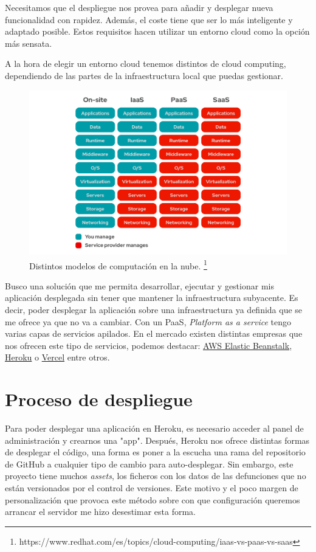 Necesitamos que el despliegue nos provea para añadir y desplegar nueva funcionalidad con rapidez. Además, el coste tiene que ser lo más inteligente y adaptado posible. Estos requisitos hacen utilizar un entorno cloud como la opción más sensata.

A la hora de elegir un entorno cloud tenemos distintos de cloud computing, dependiendo de las partes de la infraestructura local que puedas gestionar.

\FloatBarrier
\begin{figure}[h]
	\centering	
	\includegraphics[width=\textwidth]{doc/logos/imgs/iaas-paas.png}
	\caption{ Distintos modelos de computación en la nube. \footnote{https://www.redhat.com/es/topics/cloud-computing/iaas-vs-paas-vs-saas} }
    \label{fig:tipos-de-cc}
\end{figure}
\FloatBarrier

Busco una solución que me permita desarrollar, ejecutar y gestionar mis aplicación desplegada sin tener que mantener la infraestructura subyacente. Es decir, poder desplegar la aplicación sobre una infraestructura ya definida que se me ofrece ya que no va a cambiar. Con un PaaS, \textit{Platform as a service} tengo varias capas de servicios apilados.
En el mercado existen distintas empresas que nos ofrecen este tipo de servicios, podemos destacar: \href{https://aws.amazon.com/es/elasticbeanstalk/}{AWS Elastic Beanstalk}, \href{https://dashboard.heroku.com/login}{Heroku} o \href{https://vercel.com/}{Vercel} entre otros.

\section{Proceso de despliegue}
Para poder desplegar una aplicación en Heroku, es necesario acceder al panel de 
administración y crearnos una "app". Después, Heroku nos ofrece distintas formas de 
desplegar el código, una forma es poner a la escucha una rama del repositorio de GitHub a cualquier tipo de cambio para auto-desplegar. Sin embargo, este proyecto tiene muchos
\textit{assets}, los ficheros con los datos de las defunciones que no están versionados por el control de versiones. Este motivo y el poco margen de personalización que provoca este método sobre con que configuración queremos arrancar el servidor me hizo desestimar esta forma.

